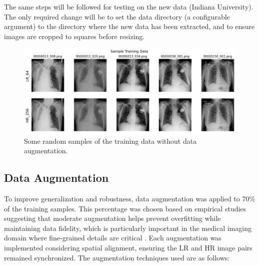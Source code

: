 \documentclass{article} %
\begin{document}
The same steps will be followed for testing on the new data (Indiana University). The only required change will be to set the data directory (a configurable argument) to the directory where the new data has been extracted, and to ensure images are cropped to squares before resizing.

\begin{figure}[h]
\begin{center}
\includegraphics[width=1\textwidth]{Figs/training_samples.png}
\end{center}
\caption{Some random samples of the training data without data augmentation.}
\label{training_samples}
\end{figure}

\subsection{Data Augmentation}

To improve generalization and robustness, data augmentation was applied to 70\% of the training samples. This percentage was chosen based on empirical studies suggesting that moderate augmentation helps prevent overfitting while maintaining data fidelity, which is particularly important in the medical imaging domain where fine-grained details are critical \citep{athalye23, sanaat22}. Each augmentation was implemented considering spatial alignment, ensuring the LR and HR image pairs remained synchronized. The augmentation techniques used are as follows:
\end{document}
